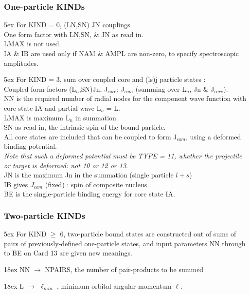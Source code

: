 \documentclass[11pt]{article}
\begin{document}
\subsubsection{One-particle KINDs}
\bigskip

\hangindent 5ex
For KIND = 0,   (LN,SN) JN couplings.
\\
One form factor with LN,SN, \& JN as read in.
\\
LMAX is not used.
\\
IA \& IB are used only if NAM \& AMPL are non-zero, to specify
spectroscopic amplitudes.
\bigskip

\hangindent 5ex
For KIND = 3,   sum over coupled core and (ls)j particle states :
\\
Coupled form factors (L$_n$,SN)Jn,  J$_{core}$; J$_{com}$
        (summing over L$_n$,   Jn \& J$_{core}$).
\\
NN is the required number of radial nodes for the component
wave function with core state IA and partial wave L$_n$ = L.
\\
LMAX is maximum L$_n$ in summation.
\\
SN as read in, the intrinsic spin of the bound particle.
\\
All core states are included that can be coupled to form J$_{com}$,
using a deformed binding potential.
\\
{\em Note that such a deformed potential must be TYPE = 11,
whether the projectile or target is deformed: not 10 or 12 or 13}.
\\
JN is the maximum Jn in the summation (single particle $l+s$)
\\
IB gives $J_{com}$ (fixed) : spin of composite nucleus.
\\
BE is the single-particle binding energy for core state IA.

\subsubsection{Two-particle KINDs}
\bigskip

\hangindent 5ex
For KIND $\geq$ 6,   two-particle bound states are constructed out of sums
of pairs of previously-defined one-particle states,
and input parameters NN through to BE on Card 13 are given new meanings.
\bigskip

\hangindent 18ex
NN    $\rightarrow$ NPAIRS, the number of pair-products to be summed

\hangindent 18ex
L     $\rightarrow$ $\ell_{min}$ , minimum orbital angular momentum $\ell$.
\end{document}

